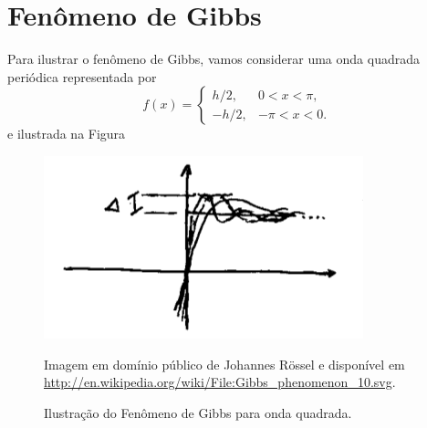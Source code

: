\section{Fenômeno de Gibbs}
Para ilustrar o fenômeno de Gibbs, vamos considerar uma onda quadrada periódica
representada por
\begin{dmath*}
  f(x) = \begin{cases}
    h/2, & 0 < x < \pi, \\
    -h/2, & -\pi < x < 0.
  \end{cases}
\end{dmath*}
e ilustrada na Figura
\begin{figure}[!htb]
  \centering
  \includegraphics[width=.5\textwidth]{figuras/05-0}
  \begin{flushright}
    Imagem em domínio público de Johannes Rössel e disponível em
    \url{http://en.wikipedia.org/wiki/File:Gibbs_phenomenon_10.svg}.
  \end{flushright}
  \caption{Ilustração do Fenômeno de Gibbs para onda quadrada.}
  \label{fig:fenom_gibbs}
\end{figure}

